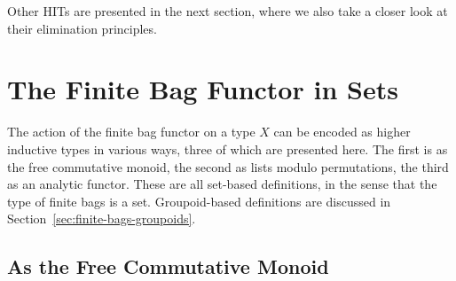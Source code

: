 \documentclass[runningheads]{llncs}
\begin{document}
Other HITs are presented in the next section, where we also take a closer look at their elimination principles.



\section{The Finite Bag Functor in Sets}\label{sec:finite-bags-sets}

The action of the finite bag functor on a type $X$ can be encoded as higher inductive
types in various ways, three of which are presented here. 
The first is as the free commutative monoid, the second as lists modulo permutations,
the third as an analytic functor. These are all set-based definitions, in the sense that the type of finite bags is a set. Groupoid-based definitions are discussed in Section~\ref{sec:finite-bags-groupoids}.

\subsection{As the Free Commutative Monoid}
\end{document}
